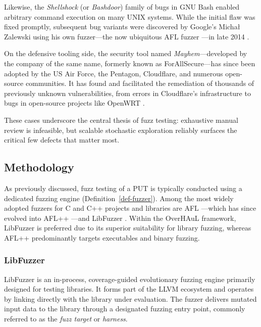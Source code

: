 \documentclass[
  a4paper,
]{scrreprt}
\theoremstyle{definition}
\theoremstyle{remark}
\begin{document}
Likewise, the \emph{Shellshock} (or \emph{Bashdoor}) family of bugs in
GNU Bash \autocite{bash} enabled arbitrary command execution on many
UNIX systems. While the initial flaw was fixed promptly, subsequent bug
variants were discovered by Google's Michał Zalewski using his own
fuzzer---the now ubiquitous AFL fuzzer \autocite{afl}---in late 2014
\autocite{saarinen2014}.

On the defensive tooling side, the security tool named
\emph{Mayhem}---developed by the company of the same name, formerly
known as ForAllSecure---has since been adopted by the US Air Force, the
Pentagon, Cloudflare, and numerous open-source communities. It has found
and facilitated the remediation of thousands of previously unknown
vulnerabilities, from errors in Cloudflare's infrastructure to bugs in
open-source projects like OpenWRT \autocite{simonite2020mayhem}.

These cases underscore the central thesis of fuzz testing: exhaustive
manual review is infeasible, but scalable stochastic exploration
reliably surfaces the critical few defects that matter most.

\subsection{Methodology}\label{methodology}

As previously discussed, fuzz testing of a PUT is typically conducted
using a dedicated fuzzing engine (Definition~\ref{def-fuzzer}). Among
the most widely adopted fuzzers for C and C++ projects and libraries are
AFL \autocite{afl}---which has since evolved into AFL++
\autocite{aflpp}---and LibFuzzer \autocite{libfuzzer}. Within the
OverHAuL framework, LibFuzzer is preferred due to its superior
suitability for library fuzzing, whereas AFL++ predominantly targets
executables and binary fuzzing.

\subsubsection{LibFuzzer}\label{libfuzzer}

LibFuzzer \autocite{libfuzzer} is an in-process, coverage-guided
evolutionary fuzzing engine primarily designed for testing libraries. It
forms part of the LLVM ecosystem \autocite{llvm} and operates by linking
directly with the library under evaluation. The fuzzer delivers mutated
input data to the library through a designated fuzzing entry point,
commonly referred to as the \emph{fuzz target} or \emph{harness}.
\end{document}
